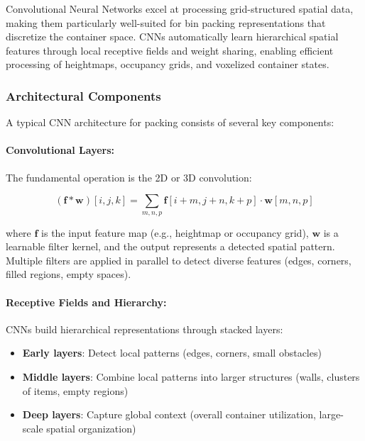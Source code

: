 Convolutional Neural Networks excel at processing grid-structured spatial data, making them particularly well-suited for bin packing representations that discretize the container space. CNNs automatically learn hierarchical spatial features through local receptive fields and weight sharing, enabling efficient processing of heightmaps, occupancy grids, and voxelized container states.

\subsubsection{Architectural Components}

A typical CNN architecture for packing consists of several key components:

\paragraph{Convolutional Layers:}

The fundamental operation is the 2D or 3D convolution:

\begin{equation}
(\mathbf{f} * \mathbf{w})[i, j, k] = \sum_{m,n,p} \mathbf{f}[i+m, j+n, k+p] \cdot \mathbf{w}[m, n, p]
\end{equation}

where $\mathbf{f}$ is the input feature map (e.g., heightmap or occupancy grid), $\mathbf{w}$ is a learnable filter kernel, and the output represents a detected spatial pattern. Multiple filters are applied in parallel to detect diverse features (edges, corners, filled regions, empty spaces).

\paragraph{Receptive Fields and Hierarchy:}

CNNs build hierarchical representations through stacked layers:
\begin{itemize}
\item \textbf{Early layers}: Detect local patterns (edges, corners, small obstacles)
\item \textbf{Middle layers}: Combine local patterns into larger structures (walls, clusters of items, empty regions)
\item \textbf{Deep layers}: Capture global context (overall container utilization, large-scale spatial organization)
\end{itemize}


